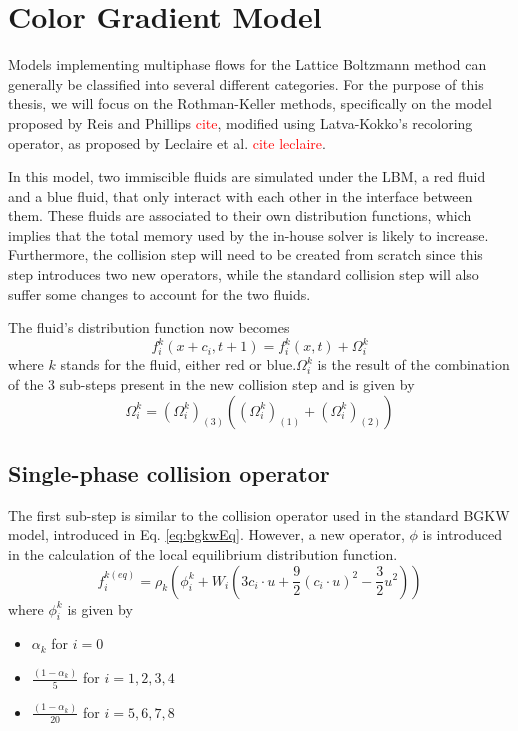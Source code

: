 \documentclass[12pt]{book}
\begin{document}
\section{Color Gradient Model}\label{sec:cgModel}
Models implementing multiphase flows for the Lattice Boltzmann method can generally be classified into several different categories. For the purpose of this thesis, we will focus on the Rothman-Keller methods, specifically on the model proposed by Reis and Phillips \textcolor{red}{cite}, modified using Latva-Kokko's recoloring operator, as proposed by Leclaire et al. \textcolor{red}{cite leclaire}. \par
In this model, two immiscible fluids are simulated under the LBM, a red fluid and a blue fluid, that only interact with each other in the interface between them. These fluids are associated to their own distribution functions, which implies that the total memory used by the in-house solver is likely to increase. Furthermore, the collision step will need to be created from scratch since this step introduces two new operators, while the standard collision step will also suffer some changes to account for the two fluids. \par
The fluid's distribution function now becomes
\begin{equation}\label{eq:cgDistrib}
f_{i}^{k}\left(x+c_i, t+1\right) = f_{i}^{k}\left(x,t\right) + \Omega_i^{k}
\end{equation}
where $k$ stands for the fluid, either red or blue.$\Omega_i^{k}$ is the result of the combination of the 3 sub-steps present in the new collision step and is given by
\begin{equation}\label{eq:cgColl}
\Omega_i^{k} = \left(\Omega_i^{k}\right)_{\left(3\right)} \left(\left(\Omega_i^{k}\right)_{\left(1\right)} + \left(\Omega_i^{k}\right)_{\left(2\right)}\right)
\end{equation}
\subsection{Single-phase collision operator}
The first sub-step is similar to the collision operator used in the standard BGKW model, introduced in Eq. \ref{eq:bgkwEq}. However, a new operator, $\phi$ is introduced in the calculation of the local equilibrium distribution function. 
\begin{equation}\label{eq:newFEQ}
f_i^{k\left(eq\right)} = \rho_k\left(\phi_i^k + W_i\left(3c_i \cdot u + \frac{9}{2}\left(c_i \cdot u\right)^2 - \frac{3}{2}u^2 \right)\right)
\end{equation}
where $\phi_i^k$ is given by 
\begin{itemize}
	\item $\alpha_k$ for $i = 0$
	\item $\frac{\left(1-\alpha_k\right)}{5}$ for $i = {1,2,3,4}$
	\item $\frac{\left(1-\alpha_k\right)}{20}$ for $i = {5,6,7,8}$
\end{itemize}
\end{document}
